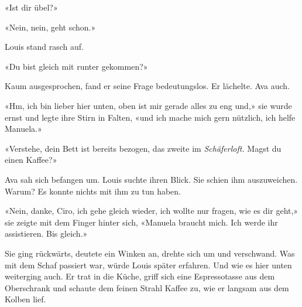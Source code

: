 «Ist dir übel?»

«Nein, nein, geht schon.»

Louis stand rasch auf.

«Du bist gleich mit runter gekommen?»

Kaum ausgesprochen, fand er seine Frage bedeutungslos. Er lächelte. Ava
auch.

«Hm, ich bin lieber hier unten, oben ist mir gerade alles zu eng und,»
sie wurde ernst und legte ihre Stirn in Falten, «und ich mache mich gern
nützlich, ich helfe Manuela.»

«Verstehe, dein Bett ist bereits bezogen, das zweite im
\emph{Schäferloft.} Magst du einen Kaffee?»

Ava sah sich befangen um. Louis suchte ihren Blick. Sie schien ihm
auszuweichen. Warum? Es konnte nichts mit ihm zu tun haben.

«Nein, danke, Ciro, ich gehe gleich wieder, ich wollte nur fragen, wie
es dir geht,» sie zeigte mit dem Finger hinter sich, «Manuela braucht
mich. Ich werde ihr assistieren. Bis gleich.»

Sie ging rückwärts, deutete ein Winken an, drehte sich um und
verschwand.
Was mit dem Schaf passiert war, würde Louis später erfahren. Und wie es
hier unten weiterging auch.
Er trat in die Küche, griff sich eine Espressotasse aus dem Oberschrank und schaute dem feinen Strahl Kaffee zu, wie er  langsam aus dem Kolben lief.
